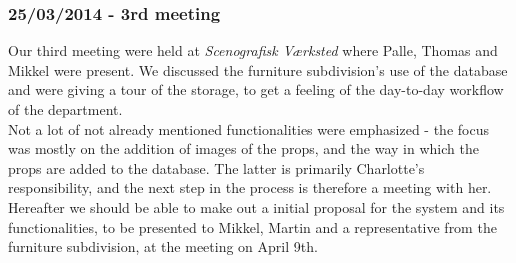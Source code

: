 \documentclass[12pt]{article}
\begin{document}
\subsubsection{25/03/2014 - 3rd meeting}
Our third meeting were held at \textit{Scenografisk Værksted} where Palle, Thomas and Mikkel were present. We discussed the furniture subdivision's use of the database and were giving a tour of the storage, to get a feeling of the day-to-day workflow of the department. \\
Not a lot of not already mentioned functionalities were emphasized - the focus was mostly on the addition of images of the props, and the way in which the props are added to the database. The latter is primarily Charlotte's responsibility, and the next step in the process is therefore a meeting with her. Hereafter we should be able to make out a initial proposal for the system and its functionalities, to be presented to Mikkel, Martin and a representative from the furniture subdivision, at the meeting on April 9th.
\end{document}
